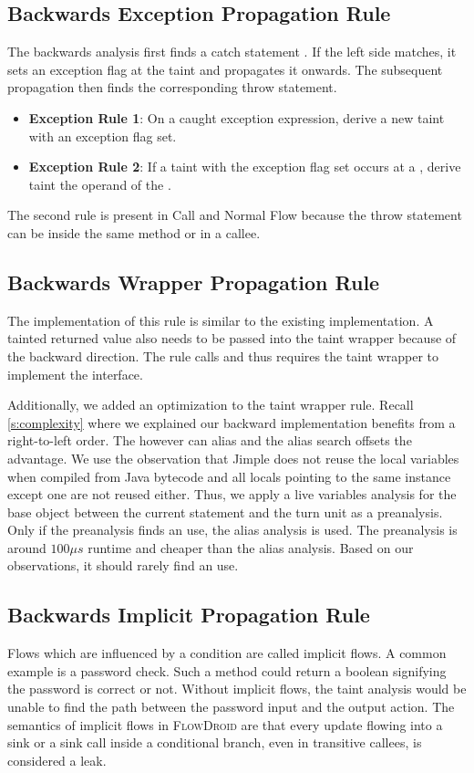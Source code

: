 \documentclass[../draft.tex]{subfiles}
\begin{document}
    \subsection{Backwards Exception Propagation Rule}
    The backwards analysis first finds a catch statement .
    If the left side matches, it sets an exception flag at the taint and propagates it onwards.
    The subsequent propagation then finds the corresponding throw statement.
    \begin{itemize}
        \item \textbf{Exception Rule 1}: On a caught exception expression, derive a new taint with an exception flag set.
        \item \textbf{Exception Rule 2}: If a taint with the exception flag set occurs at a , derive taint the operand of the .
    \end{itemize}
    The second rule is present in Call and Normal Flow because the throw statement can be inside the same method or in a callee.

    \subsection{Backwards Wrapper Propagation Rule}
    The implementation of this rule is similar to the existing implementation.
    A tainted returned value also needs to be passed into the taint wrapper because of the backward direction.
    The rule calls  and thus requires the taint wrapper to implement the  interface.

    Additionally, we added an optimization to the taint wrapper rule.
    Recall \autoref{s:complexity} where we explained our backward implementation benefits from a right-to-left order.
    The  however can alias and the alias search offsets the advantage.
    We use the observation that Jimple does not reuse the local variables when compiled from Java bytecode and all locals pointing to the same  instance except one are not reused either.
    Thus, we apply a live variables analysis for the base object between the current statement and the turn unit as a preanalysis.
    Only if the preanalysis finds an use, the alias analysis is used.
    The preanalysis is around $100\mu s$ runtime and cheaper than the alias analysis.
    Based on our observations, it should rarely find an use.

    \subsection{Backwards Implicit Propagation Rule}
    Flows which are influenced by a condition are called implicit flows.
    A common example is a password check.
    Such a method could return a boolean signifying the password is correct or not.
    Without implicit flows, the taint analysis would be unable to find the path between the password input and the output action.
    The semantics of implicit flows in \textsc{FlowDroid} are that every update flowing into a sink or a sink call inside a conditional branch, even in transitive callees, is considered a leak.
\end{document}
